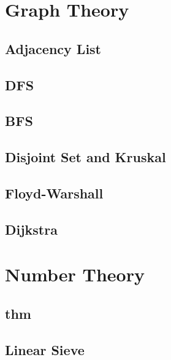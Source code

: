 \section{Graph Theory}
    \subsection{Adjacency List}
            
    \subsection{DFS}
        
    \subsection{BFS}
        
    \subsection{Disjoint Set and Kruskal}
        
    \subsection{Floyd-Warshall}
        
    \subsection{Dijkstra}
        

\section{Number Theory}
    \subsection{thm}
        
    \subsection{Linear Sieve}
        